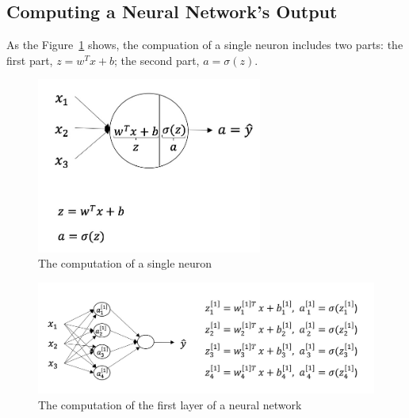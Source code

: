 \documentclass[UTF8]{article}
\newcommand{\Vector}[1]{\boldsymbol{\mathit{#1}}}   %
\begin{document}
\subsection{Computing a Neural Network's Output}
As the Figure~\ref{fig:neuron-compuation} shows, the compuation of a single neuron includes two
parts: the first part, $\Vector{z} = \Vector{w}^T\Vector{x} + b$; the second part,
$\Vector{a} = \sigma(\Vector{z})$.
\begin{figure}[htb]
    \centering
    \includegraphics[width=20em]{figures/neuron-computation}
    \caption{The computation of a single neuron}
    \label{fig:neuron-compuation}
\end{figure}

\begin{figure}[htb]
    \centering
    \includegraphics[width=40em]{figures/nn-first-layer-computation}
    \caption{The computation of the first layer of a neural network}
    \label{fig:nn-first-layer-computation}
\end{figure}
\end{document}

